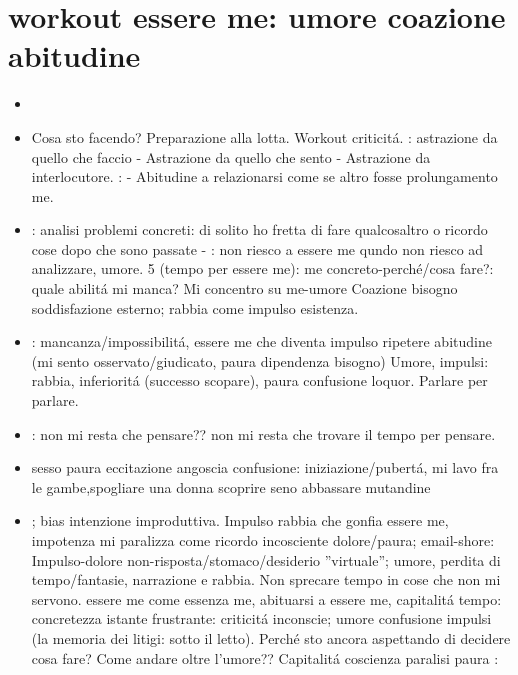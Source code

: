 {\let\clearpage\relax
\chapter{workout essere me: umore coazione abitudine}
}
\begin{itemize}
\item {}
\item Cosa sto facendo? Preparazione alla lotta. Workout criticit\'a. : astrazione da quello che faccio - Astrazione da quello che sento - Astrazione da interlocutore. : - Abitudine a relazionarsi come se altro fosse prolungamento me.
\item {}: analisi problemi concreti: di solito ho fretta di fare qualcosaltro o ricordo cose dopo che sono passate - : non riesco a essere me qundo non riesco ad analizzare, umore. 5 (tempo per essere me): me concreto-perch\'e/cosa fare?: quale abilit\'a mi manca?
Mi concentro su me-umore Coazione bisogno soddisfazione esterno; rabbia come impulso esistenza.
\item {}: mancanza/impossibilit\'a, essere me che diventa impulso ripetere abitudine (mi sento osservato/giudicato, paura dipendenza bisogno)
Umore, impulsi: rabbia, inferiorit\'a (successo scopare), paura confusione loquor. Parlare per parlare.
\item {}: non mi resta che pensare?? non mi resta che trovare il tempo per pensare.
\item sesso paura eccitazione angoscia confusione: iniziazione/pubert\'a, mi lavo fra le gambe,spogliare una donna scoprire seno abbassare mutandine
\item {}; bias intenzione improduttiva. Impulso rabbia che gonfia essere me, impotenza mi paralizza come ricordo incosciente dolore/paura; email-shore: Impulso-dolore non-risposta/stomaco/desiderio ''virtuale''; umore, perdita di tempo/fantasie, narrazione e rabbia. Non sprecare tempo in cose che non mi servono. essere me come essenza me, abituarsi a essere me, capitalit\'a tempo: concretezza istante frustrante: criticit\'a inconscie; umore confusione impulsi (la memoria dei litigi: sotto il letto). Perch\'e sto ancora aspettando di decidere cosa fare? Come andare oltre l'umore??
Capitalit\'a coscienza paralisi paura
:
\begin{itemize}

\end{itemize}
\end{itemize}
